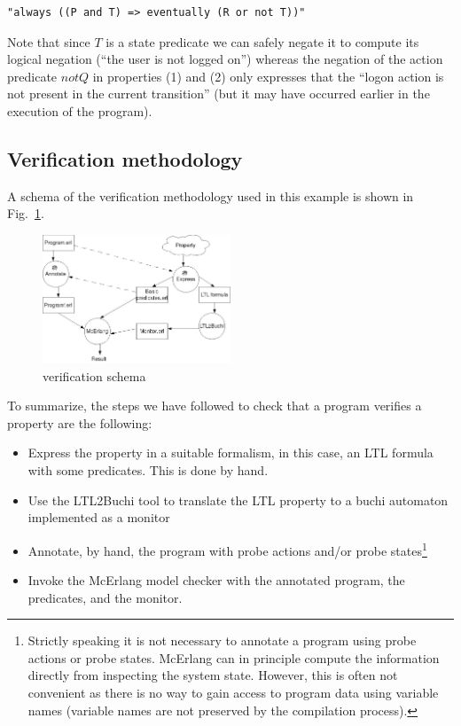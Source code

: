 \documentclass[a4paper]{article}
\begin{document}
\begin{verbatim}
"always ((P and T) => eventually (R or not T))"
\end{verbatim}


Note that since $\mathit{T}$ is a state predicate we can safely negate
it to compute its logical negation (``the user is not logged on'')
whereas the negation of the action predicate $\mathit{not Q}$ in
properties (1) and (2) only expresses that the ``logon action is not
present in the current transition'' (but it may have occurred earlier
in the execution of the program).

\subsection{Verification methodology}

A schema of the verification methodology used in this example is shown
in Fig.\ \ref{methodology}. 
\begin{figure}[Htbp]
\begin{center}
   \includegraphics*[width=0.5\textwidth]{methodology}
   \caption{verification schema}
   \label{methodology}
\end{center}
\end{figure}
To summarize, the steps we have followed to check that a program
verifies a property are the following:

\begin{itemize}
  \item Express the property in a suitable formalism, in this case, an
    LTL formula with some predicates. This is done by hand.
  \item Use the LTL2Buchi tool to translate the LTL property to a
    buchi automaton implemented as a monitor
  \item Annotate, by hand, the program with probe actions and/or probe 
states\footnote{Strictly speaking it is not necessary to annotate a program
using probe actions or probe states. McErlang can in principle
compute the information directly from inspecting the system state. However,
this is often not convenient as there is no way to gain access to
program data using variable names (variable names are not preserved
by the compilation process).}
  \item Invoke the McErlang model checker with the annotated program,
    the predicates, and the monitor.
\end{itemize}
\end{document}
